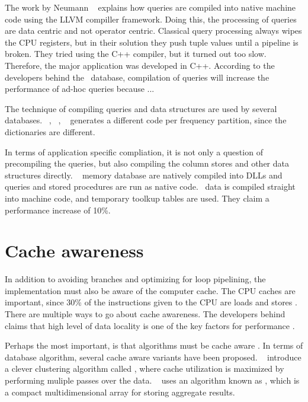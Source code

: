 The work by Neumann \ea~\cite{Neumann2011-uq} explains how queries are compiled into native machine code using the LLVM compiller framework. Doing this, the processing of queries are data centric and not operator centric. Classical query processing always wipes the CPU registers, but in their solution they push tuple values until a pipeline is broken. They tried using the C++ compiler, but it turned out too slow. Therefore, the major application was developed in C++. According to the developers behind the \hyper~database, compilation of queries will increase the performance of ad-hoc queries because ...

The technique of compiling queries and data structures are used by several databases. \blink~\cite{Barber2012-xt}, \ibm~\cite{Raman2013-em}, \vertica~\cite{Lamb2012-kg} generates a different code per frequency partition, since the dictionaries are different. 


In terms of application specific compliation, it is not only a question of precompiling the queries, but also compiling the column stores and other data structures directly. \mssql~\cite{Delaney2014-ip} memory database are natively compiled into DLLs and queries and stored procedures are run as native code.\qlikview~\cite{noauthor_undated-js} data is compiled straight into machine code, and temporary toolkup tables are used. They claim a performance increase of 10\%.

\section{Cache awareness}
\label{sec:Cache awareness}
In addition to avoiding branches and optimizing for loop pipelining, the implementation must also be aware of the computer cache. The CPU caches are important, since 30\% of the instructions given to the CPU are loads and stores \cite{Boncz2005-wj}. There are multiple ways to go about cache awareness. The developers behind \exasol claims that high level of data locality is one of the key factors for performance \cite{Exasol2014-xh}.

Perhaps the most important, is that algorithms must be cache aware \cite{Farber2012-vh}. In terms of database algorithm, several cache aware variants have been proposed. \monetdb~\cite{Boncz2002-yj} introduce a clever clustering algorithm called , where cache utilization is maximized by performing muliple passes over the data. \oracle~\cite{Lahiri2015-mz} uses an algorithm known as , which is a compact multidimensional array for storing aggregate results.

